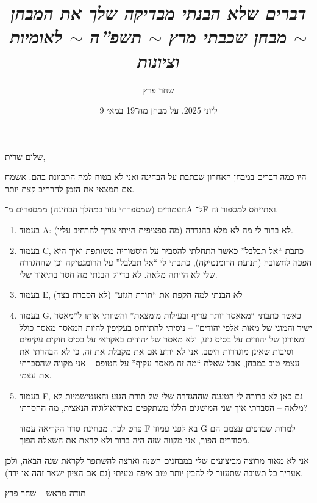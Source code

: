 \documentclass[]{article}
\author{שחר פרץ}
\title{\textit{דברים שלא הבנתי מבדיקה שלך את המבחן $\sim$ מבחן שכבתי מרץ $\sim$ תשפ''ה $\sim$ לאומיות וציונות}}
\date{9 ליוני 2025, על מבחן מה־19 במאי}
\begin{document}
    \maketitle
    
    שלום שרית, 
    
    היו כמה דברים במבחן האחרון שכתבת על הבחינה ואני לא בטוח למה התכוונת בהם. אשמח אם תמצאי את הזמן להרחיב קצת יותר. 
    
    העמודים (שמספרתי עוד במהלך הבחינה) ממספרים מ־A ל־F ואתייחס למספור זה. 
    
    \begin{enumerate}
        \item בעמוד A: לא ברור לי מה לא מלא בהגדרה (מה ספציפית הייתי צריך להרחיב עליו). 
        \item בעמוד C, כתבת ``אל תבלבל'' כאשר התחלתי להסביר על היסטוריה משותפת ואיך היא הפכה לחשובה (תנועת הרומנטיקה), כתבתי לי ``אל תבלבל'' על הרומנטיקה וכן שההגדרה שלי לא הייתה מלאה. לא בדיוק הבנתי מה חסר בתיאור שלי. 
        \item בעמוד E, לא הבנתי למה הקפת את ``תורת הגזע'' (לא הסברת בצד)
        \item בעמוד G, כאשר כתבתי ``מאאסר יותר עדיף ובעילות מומצאת'' והשוותי אותו ל''מאסר ישיר והמוני של מאות אלפי יהודים'' – ניסיתי להתייחס בעקיפין להיות המאסר מאסר כולל ומאורגן של יהודים על בסיס גזע, ולא מאסר של יהודים באקראי על בסיס חוקים עקיפים וסיבות שאינן מוגדרות היטב. אני לא יודע אם את מקבלת את זה, כי לא הבהרתי את עצמי טוב במבחן, אבל שאלת ``מה זה מאסר עקיף'' על הטופס  – אני מקווה שהסברתי את עצמי. 
        \item בעמוד F, גם כאן לא ברורה לי הטענה שההגדרה שלי של תורת הגזע והאנטישמיות לא מלאה – הסברתי איך שני המושגים הללו משתקפים באידיאולוגיה הנאצית, מה החסרתי? 
        
        פרט לכך, מבחינת סדר הקריאה עמוד F בא לפני עמוד G למרות שבדפים עצמם הם מסודרים הפוך, אני מקווה שזה היה ברור ולא קראת את השאלה הפוך. 
    \end{enumerate}
    
    אני לא מאוד מרוצה מביצועים שלי במבחנים השנה וארצה להשתפר לקראת שנה הבאה, ולכן אעריך כל תשובה שתעזור לי להבין יותר טוב איפה טעיתי (גם אם הציון ישאר זהה או ירד).
    
    \hfill תודה מראש – שחר פרץ
    
    \dotfill
\end{document}
